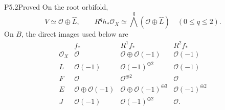 \begin{statement}{P5.2}{Proved}
On the root orbifold,
\[
 V\simeq\mathcal O\oplus\widehat L,
 \qquad R^qh_*\mathcal O_X\simeq
 \bigwedge^q(\mathcal O\oplus\widehat L)\quad(0\leq q\leq2).
\]
On $B$, the direct images used below are
\[
\begin{array}{c|ccc}
 & f_* & R^1f_* &R^2f_*\\ \hline
 \mathcal O_X&\mathcal O&\mathcal O\oplus\mathcal O(-1)&\mathcal O(-1)\\
 L&\mathcal O(-1)&\mathcal O(-1)^{\oplus2}&\mathcal O(-1)\\
 F&\mathcal O&\mathcal O^{\oplus2}&\mathcal O\\
 E&\mathcal O\oplus\mathcal O(-1)&\mathcal O\oplus\mathcal O(-1)^{\oplus3}
       &\mathcal O(-1)^{\oplus2}\\
 J&\mathcal O(-1)&\mathcal O(-1)^{\oplus2}&\mathcal O .
\end{array}
\]
\end{statement}
